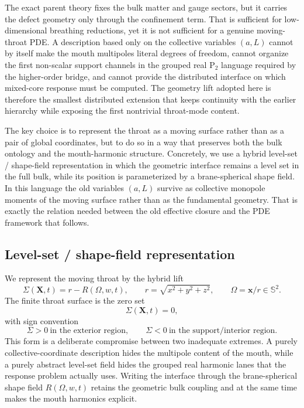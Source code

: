 \documentclass[11pt]{article}
\theoremstyle{definition}
\newcommand{\Ptwo}{\ensuremath{\mathrm{P}_2}}
\newcommand{\bbS}{\mathbb S}
\begin{document}
The exact parent theory fixes the bulk matter and gauge sectors, but it carries the defect geometry only through the confinement term. That is sufficient for low-dimensional breathing reductions, yet it is not sufficient for a genuine moving-throat PDE. A description based only on the collective variables $(a,L)$ cannot by itself make the mouth multipoles literal degrees of freedom, cannot organize the first non-scalar support channels in the grouped real $\Ptwo$ language required by the higher-order bridge, and cannot provide the distributed interface on which mixed-core response must be computed. The geometry lift adopted here is therefore the smallest distributed extension that keeps continuity with the earlier hierarchy while exposing the first nontrivial throat-mode content.

The key choice is to represent the throat as a moving surface rather than as a pair of global coordinates, but to do so in a way that preserves both the bulk ontology and the mouth-harmonic structure. Concretely, we use a hybrid level-set / shape-field representation in which the geometric interface remains a level set in the full bulk, while its position is parameterized by a brane-spherical shape field. In this language the old variables $(a,L)$ survive as collective monopole moments of the moving surface rather than as the fundamental geometry. That is exactly the relation needed between the old effective closure and the PDE framework that follows.

\subsection{Level-set / shape-field representation}

We represent the moving throat by the hybrid lift
\begin{equation}
\Sigma(\mathbf X,t)=r-R(\Omega,w,t),
\qquad
r=\sqrt{x^2+y^2+z^2},
\qquad
\Omega=\mathbf x/r\in\bbS^2.
\label{eq:geometry-lift-levelset}
\end{equation}
The finite throat surface is the zero set
\begin{equation}
\Sigma(\mathbf X,t)=0,
\label{eq:geometry-lift-surface}
\end{equation}
with sign convention
\[
\Sigma>0\ \text{in the exterior region},
\qquad
\Sigma<0\ \text{in the support/interior region}.
\]
This form is a deliberate compromise between two inadequate extremes. A purely collective-coordinate description hides the multipole content of the mouth, while a purely abstract level-set field hides the grouped real harmonic lanes that the response problem actually uses. Writing the interface through the brane-spherical shape field $R(\Omega,w,t)$ retains the geometric bulk coupling and at the same time makes the mouth harmonics explicit.
\end{document}
